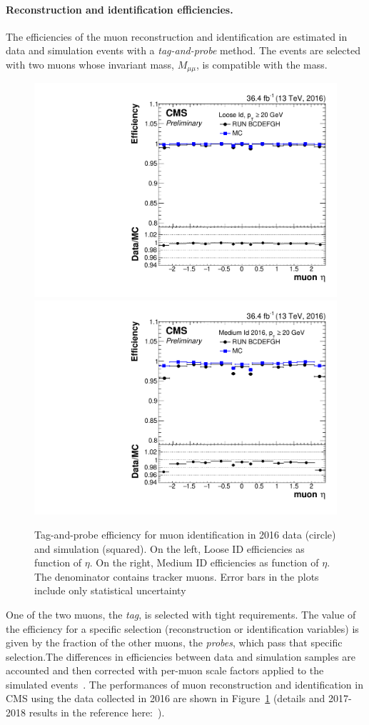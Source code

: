 \paragraph{Reconstruction and identification
  efficiencies.}\label{sec:c2effmuon}

The efficiencies of the muon reconstruction and identification are
estimated in data and simulation events with a \emph{tag-and-probe}
method. The events are selected with two muons whose invariant mass,
$M_{\mu \mu}$, is compatible with the \PZ mass. 
\begin{figure}[h!]
\centering
\includegraphics[width=.48\textwidth]{Figures/c2/TnP_MC_NUM_LooseID_DEN_genTracks_PAR_eta_.pdf}
\includegraphics[width=.48\textwidth]{Figures/c2/TnP_MC_NUM_MediumID2016_DEN_genTracks_PAR_eta_.pdf}
\caption{Tag-and-probe efficiency for muon identification in 2016 data
  (circle) and simulation (squared). On the left, Loose ID efficiencies as function of $\eta$. 
On the right, Medium ID efficiencies as function of $\eta$. The
  denominator contains tracker muons. Error bars in the plots include only statistical uncertainty~\cite{CMS-DP-2017-007}}
\label{fig:2016eff}
\end{figure}
One of the two muons,
the \emph{tag}, is selected with tight requirements. The value of the
efficiency for a specific selection (reconstruction or identification
variables) is given by the fraction of the other muons, the
\emph{probes}, which pass that specific selection.The differences in
efficiencies between data and simulation samples are accounted and
then corrected with per-muon scale factors applied to the simulated
events~\cite{Sirunyan_2018_muon}. The performances of muon
reconstruction and identification in CMS using the data collected in
2016 are shown in Figure~\ref{fig:2016eff} (details and 2017-2018
results in the reference
here:~\cite{CMS-DP-2017-007,CMS-DP-2018-042}).

